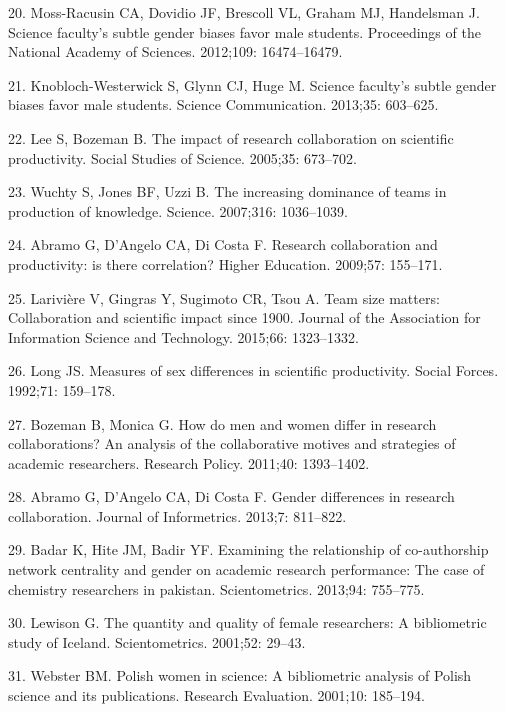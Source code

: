 \documentclass[12pt,]{article}
\begin{document}
\hypertarget{ref-Moss_2012}{}
20. Moss-Racusin CA, Dovidio JF, Brescoll VL, Graham MJ, Handelsman J.
Science faculty's subtle gender biases favor male students. Proceedings
of the National Academy of Sciences. 2012;109: 16474--16479.

\hypertarget{ref-Knobloch_2013}{}
21. Knobloch-Westerwick S, Glynn CJ, Huge M. Science faculty's subtle
gender biases favor male students. Science Communication. 2013;35:
603--625.

\hypertarget{ref-Lee_2005}{}
22. Lee S, Bozeman B. The impact of research collaboration on scientific
productivity. Social Studies of Science. 2005;35: 673--702.

\hypertarget{ref-Wuchty_2007}{}
23. Wuchty S, Jones BF, Uzzi B. The increasing dominance of teams in
production of knowledge. Science. 2007;316: 1036--1039.

\hypertarget{ref-Abramo_2009}{}
24. Abramo G, D'Angelo CA, Di Costa F. Research collaboration and
productivity: is there correlation? Higher Education. 2009;57: 155--171.

\hypertarget{ref-Lariviere_2015}{}
25. Larivière V, Gingras Y, Sugimoto CR, Tsou A. Team size matters:
Collaboration and scientific impact since 1900. Journal of the
Association for Information Science and Technology. 2015;66: 1323--1332.

\hypertarget{ref-Long_1992}{}
26. Long JS. Measures of sex differences in scientific productivity.
Social Forces. 1992;71: 159--178.

\hypertarget{ref-Bozeman_2011}{}
27. Bozeman B, Monica G. How do men and women differ in research
collaborations? An analysis of the collaborative motives and strategies
of academic researchers. Research Policy. 2011;40: 1393--1402.

\hypertarget{ref-Abramo_2013}{}
28. Abramo G, D'Angelo CA, Di Costa F. Gender differences in research
collaboration. Journal of Informetrics. 2013;7: 811--822.

\hypertarget{ref-Badar_2013}{}
29. Badar K, Hite JM, Badir YF. Examining the relationship of
co-authorship network centrality and gender on academic research
performance: The case of chemistry researchers in pakistan.
Scientometrics. 2013;94: 755--775.

\hypertarget{ref-Lewison_2001}{}
30. Lewison G. The quantity and quality of female researchers: A
bibliometric study of Iceland. Scientometrics. 2001;52: 29--43.

\hypertarget{ref-Webster_2001}{}
31. Webster BM. Polish women in science: A bibliometric analysis of
Polish science and its publications. Research Evaluation. 2001;10:
185--194.
\end{document}

